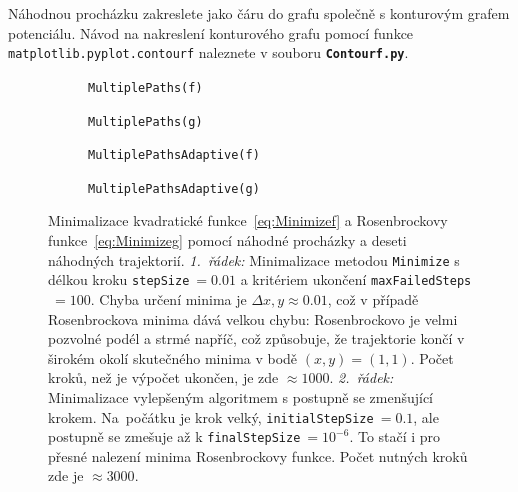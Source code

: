 \documentclass[a4paper,11pt,twoside]{article}
\def\code#1{\textnormal{\texttt{#1}}}
\def\file#1{\textnormal{\textbf{\texttt{#1}}}}
\begin{document}
    \begin{task}
        Náhodnou procházku zakreslete jako čáru do grafu společně s konturovým grafem potenciálu.
        Návod na nakreslení konturového grafu pomocí funkce \code{matplotlib.pyplot.contourf} naleznete
        v souboru \file{Contourf.py}.
    \end{task}

    \begin{solution}
        \begin{figure}[!htbp]
            \centering
            \begin{subfigure}{0.49\linewidth}
                \centering{}
                \caption{\code{MultiplePaths(f)}}
            \end{subfigure}
            \hfill
            \begin{subfigure}{0.49\linewidth}
                \centering{}
                \caption{\code{MultiplePaths(g)}}
            \end{subfigure}
            \begin{subfigure}{0.49\linewidth}
                \centering{}
                \caption{\code{MultiplePathsAdaptive(f)}}
            \end{subfigure}
            \hfill
            \begin{subfigure}{0.49\linewidth}
                \centering{}
                \caption{\code{MultiplePathsAdaptive(g)}}
            \end{subfigure}

			\caption{
                \protect\small
                Minimalizace kvadratické funkce~\eqref{eq:Minimizef} a Rosenbrockovy funkce~\eqref{eq:Minimizeg} pomocí náhodné procházky a deseti náhodných trajektorií.
                \emph{1.~řádek:} Minimalizace metodou \code{Minimize} s délkou kroku \code{stepSize}$\ =0.01$ a kritériem ukončení \code{maxFailedSteps}$\ =100$.
                Chyba určení minima je $\Delta x,y\approx0.01$, což v případě Rosenbrockova minima dává velkou chybu: Rosenbrockovo  je velmi pozvolné podél a strmé napříč, což způsobuje, že trajektorie končí v širokém okolí skutečného minima v bodě $(x,y)=(1,1)$.
                Počet kroků, než je výpočet ukončen, je zde $\approx1000$.
                \emph{2.~řádek:} Minimalizace vylepšeným algoritmem s postupně se zmenšující krokem.
                Na~počátku je krok velký, \code{initialStepSize}$\ =0.1$, ale postupně se zmešuje až k \code{finalStepSize}$\ =10^{-6}$.
                To stačí i pro přesné nalezení minima Rosenbrockovy funkce.
                Počet nutných kroků zde je $\approx3000$.
            }	
            \label{fig:RandomWalkMinimize}
		\end{figure}


\end{solution}
\end{document}
